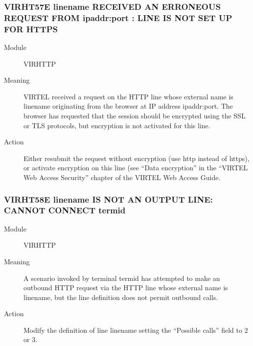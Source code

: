 \documentclass[letterpaper,10pt,english]{sphinxmanual}
\begin{document}
\subsubsection{VIRHT57E linename RECEIVED AN ERRONEOUS REQUEST FROM ipaddr:port : LINE IS NOT SET UP FOR HTTPS}
\label{\detokenize{messages:virht57e-linename-received-an-erroneous-request-from-ipaddr-port-line-is-not-set-up-for-https}}\begin{description}
\item[{Module}] \leavevmode
VIRHTTP

\item[{Meaning}] \leavevmode
VIRTEL received a request on the HTTP line whose external name is linename originating from the browser at IP address ipaddr:port. The browser has requested that the session should be encrypted using the SSL or TLS protocols, but encryption is not activated for this line.

\item[{Action}] \leavevmode
Either resubmit the request without encryption (use http instead of https), or activate encryption on this line (see “Data encryption” in the “VIRTEL Web Access Security” chapter of the VIRTEL Web Access Guide.

\end{description}


\subsubsection{VIRHT58E linename IS NOT AN OUTPUT LINE: CANNOT CONNECT termid}
\label{\detokenize{messages:virht58e-linename-is-not-an-output-line-cannot-connect-termid}}\begin{description}
\item[{Module}] \leavevmode
VIRHTTP

\item[{Meaning}] \leavevmode
A scenario invoked by terminal termid has attempted to make an outbound HTTP request via the HTTP line whose external name is linename, but the line definition does not permit outbound calls.

\item[{Action}] \leavevmode
Modify the definition of line linename setting the “Possible calls” field to 2 or 3.

\end{description}
\end{document}
